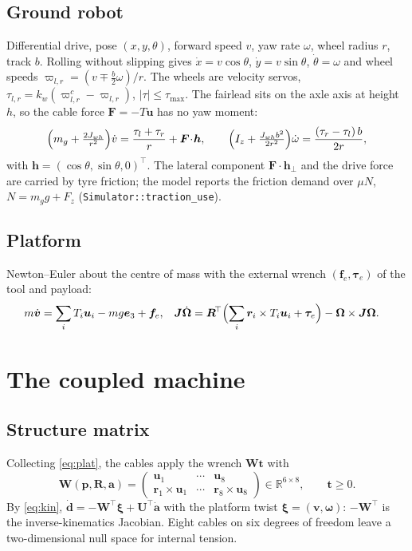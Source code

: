 \documentclass[11pt,a4paper]{article}
\newcommand{\R}{\mathbb{R}}
\newcommand{\T}{^{\!\top}}
\newcommand{\e}{\bm{e}}
\begin{document}
\subsection{Ground robot}\label{sec:ugv}
Differential drive, pose $(x,y,\theta)$, forward speed $v$, yaw rate $\omega$, wheel radius $r$, track $b$.
Rolling without slipping gives $\dot x=v\cos\theta$, $\dot y=v\sin\theta$, $\dot\theta=\omega$ and wheel speeds
$\varpi_{l,r}=(v\mp\tfrac b2\omega)/r$. The wheels are velocity servos, $\tau_{l,r}=k_w(\varpi^c_{l,r}-\varpi_{l,r})$,
$|\tau|\le\tau_{\max}$. The fairlead sits on the axle axis at height $h$, so the cable force
$\bm F=-T\bm u$ has no yaw moment:
\begin{equation}
 \Bigl(m_g+\tfrac{2J_{wh}}{r^2}\Bigr)\dot v=\frac{\tau_l+\tau_r}{r}+\bm F\!\cdot\!\bm h,\qquad
 \Bigl(I_z+\tfrac{J_{wh}b^2}{2r^2}\Bigr)\dot\omega=\frac{(\tau_r-\tau_l)\,b}{2r},
\end{equation}
with $\bm h=(\cos\theta,\sin\theta,0)\T$. The lateral component $\bm F\cdot\bm h_\perp$ and the drive force are
carried by tyre friction; the model reports the friction demand over $\mu N$, $N=m_gg+F_z$ (\texttt{Simulator::traction\_use}).

\subsection{Platform}\label{sec:platform}
Newton--Euler about the centre of mass with the external wrench $(\bm f_e,\bm\tau_e)$ of the tool and payload:
\begin{align}
 m\dot{\bm v}&=\sum_i T_i\bm u_i-mg\e_3+\bm f_e, &
 \bm J\dot{\bm\Omega}&=\bm R\T\Bigl(\sum_i\bm r_i\times T_i\bm u_i+\bm\tau_e\Bigr)-\bm\Omega\times\bm J\bm\Omega .
 \label{eq:plat}
\end{align}

\section{The coupled machine}
\subsection{Structure matrix}
Collecting \eqref{eq:plat}, the cables apply the wrench $\bm W\bm t$ with
\begin{equation}
 \bm W(\bm p,\bm R,\bm a)=\begin{pmatrix}\bm u_1&\cdots&\bm u_8\\ \bm r_1\times\bm u_1&\cdots&\bm r_8\times\bm u_8\end{pmatrix}\in\R^{6\times 8},\qquad \bm t\ge 0 .
\end{equation}
By \eqref{eq:kin}, $\dot{\bm d}=-\bm W\T\bm\xi+\bm U\T\dot{\bm a}$ with the platform twist $\bm\xi=(\bm v,\bm\omega)$:
$-\bm W\T$ is the inverse-kinematics Jacobian. Eight cables on six degrees of freedom leave a two-dimensional
null space for internal tension.
\end{document}
